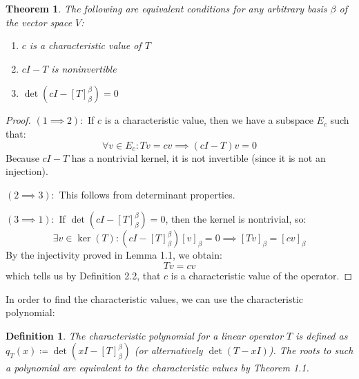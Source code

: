 \documentclass[10pt,letterpaper]{article} %
\newtheorem{thm}{Theorem}[section]
\newtheorem{defn}{Definition}[section]
\begin{document}
\begin{thm}
The following are equivalent conditions for any arbitrary basis $\beta$ of the vector space $V$:
\begin{enumerate}
\item $c$ is a characteristic value of $T$
\item $cI - T$ is noninvertible
\item $\det(cI - [T]_{\beta}^{\beta}) = 0$
\end{enumerate}
\end{thm}
\begin{proof}
$(1 \implies 2):$ If $c$ is a characteristic value, then we have a subspace $E_c$ such that:
\begin{equation*}
\forall v \in E_c: Tv  = cv \implies (cI - T)v = 0
\end{equation*}
Because $cI - T$ has a nontrivial kernel, it is not invertible (since it is not an injection).

$(2 \implies 3):$ This follows from determinant properties.

$(3 \implies 1):$ If $\det(cI - [T]_\beta^\beta) = 0$, then the kernel is nontrivial, so:
\begin{equation*}
\exists v \in \ker(T): (cI - [T]_\beta^\beta)[v]_\beta = 0 \implies [Tv]_\beta = [cv]_\beta
\end{equation*}
By the injectivity proved in Lemma 1.1, we obtain:
\begin{equation*}
Tv = cv
\end{equation*}
which tells us by Definition 2.2, that $c$ is a characteristic value of the operator. 
\end{proof}

In order to find the characteristic values, we can use the characteristic polynomial:
\begin{defn}
The characteristic polynomial for a linear operator $T$ is defined as $q_T(x) \coloneq \det(xI - [T]_\beta^\beta)$ (or alternatively $\det(T - xI)$). The roots to such a polynomial are equivalent to the characteristic values
by Theorem 1.1.
\end{defn}
\end{document}
